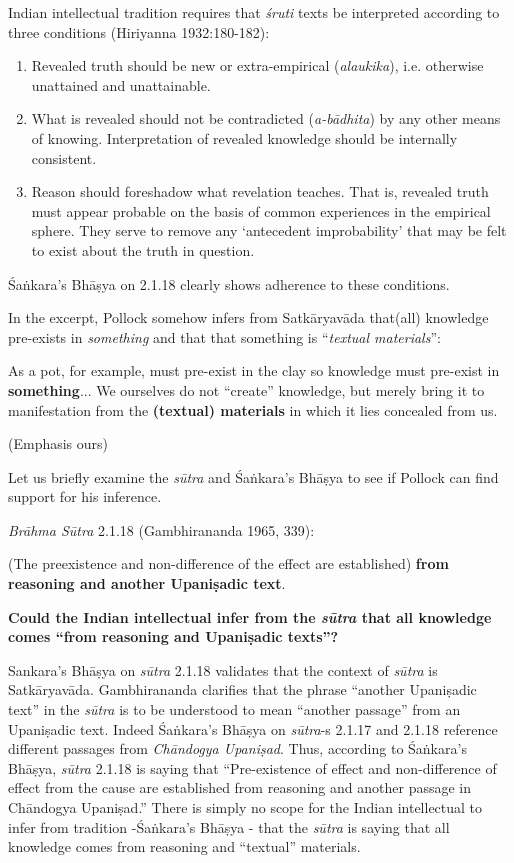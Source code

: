 Indian intellectual tradition requires that {\sl śruti} texts be interpreted according to three conditions (Hiriyanna 1932:180-182):
\begin{enumerate}
\item Revealed truth should be new or extra-empirical ({\sl alaukika}), i.e. otherwise unattained and unattainable.

\item What is revealed should not be contradicted ({\sl a-bādhita}) by any other means of knowing. Interpretation of revealed knowledge should be internally consistent.

\item Reason should foreshadow what revelation teaches. That is, revealed truth must appear probable on the basis of common experiences in the empirical sphere. They serve to remove any `antecedent improbability' that may be felt to exist about the truth in question.
\end{enumerate}

Śaṅkara's Bhāṣya on 2.1.18 clearly shows adherence to these conditions.

In the excerpt, Pollock somehow infers from Satkāryavāda that(all) knowledge pre-exists in {\sl something} and that that something is ``{\sl textual materials}'':
\begin{myquote}
As a pot, for example, must pre-exist in the clay so knowledge must pre-exist in {\bf something}... We ourselves do not ``create'' knowledge, but merely bring it to manifestation from the {\bf (textual) materials} in which it lies concealed from us. 

\hfill (Emphasis ours)
\end{myquote}

Let us briefly examine the {\sl sūtra} and Śaṅkara's Bhāṣya to see if Pollock can find support for his inference.

{\sl Brāhma Sūtra} 2.1.18 (Gambhirananda 1965, 339):
\begin{myquote}
(The preexistence and non-difference of the effect are established) \textbf{from reasoning and another Upaniṣadic text}.
\end{myquote}

\textbf{Could the Indian intellectual infer from the {\sl sūtra} that all knowledge comes ``from reasoning and Upaniṣadic texts''?}

Sankara's Bhāṣya on {\sl sūtra} 2.1.18 validates that the context of {\sl sūtra} is Satkāryavāda.  Gambhirananda clarifies that the phrase ``another Upaniṣadic text'' in the {\sl sūtra} is to be understood to mean ``another passage'' from an Upaniṣadic text. Indeed Śaṅkara's Bhāṣya on {\sl sūtra}-s 2.1.17 and 2.1.18 reference different passages from {\sl Chāndogya Upaniṣad}. Thus, according to Śaṅkara's Bhāṣya, {\sl sūtra} 2.1.18 is saying that ``Pre-existence of effect and non-difference of effect from the cause are established from reasoning and another passage in Chāndogya Upaniṣad.''  There is simply no scope for the Indian intellectual to infer from tradition -Śaṅkara's Bhāṣya - that the {\sl sūtra} is saying that all knowledge comes from reasoning and ``textual'' materials.

